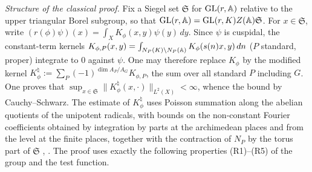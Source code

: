 \emph{Structure of the classical proof.} Fix a Siegel set $\mathfrak S$ for $\mathrm{GL}(r,\mathbb{A})$ relative to the upper triangular Borel subgroup, so that $\mathrm{GL}(r,\mathbb{A})=\mathrm{GL}(r,K)Z(\mathbb{A})\mathfrak S$. For $x\in\mathfrak S$, write $(r(\phi)\psi)(x)=\int_XK_\phi(x,y)\psi(y)\,dy$. Since $\psi$ is cuspidal, the constant-term kernels $K_{\phi,P}(x,y)=\int_{N_P(K)\backslash N_P(\mathbb{A})}K_\phi(s(n)x,y)\,dn$ ($P$ standard, proper) integrate to $0$ against $\psi$. One may therefore replace $K_\phi$ by the modified kernel $K_\phi^\natural:=\sum_{P}(-1)^{\dim A_P/A_G}K_{\phi,P}$, the sum over all standard $P$ including $G$. One proves that $\sup_{x\in\mathfrak S}\|K^\natural_\phi(x,\cdot)\|_{L^2(X)}<\infty$, whence the bound by Cauchy--Schwarz. The estimate of $K^\natural_\phi$ uses Poisson summation along the abelian quotients of the unipotent radicals, with bounds on the non-constant Fourier coefficients obtained by integration by parts at the archimedean places and from the level at the finite places, together with the contraction of $N_P$ by the torus part of $\mathfrak S$ \cite[Ch.~3, \S2]{GGPS69}, \cite[I.2]{MW95}. The proof uses exactly the following properties (R1)--(R5) of the group and the test function.

